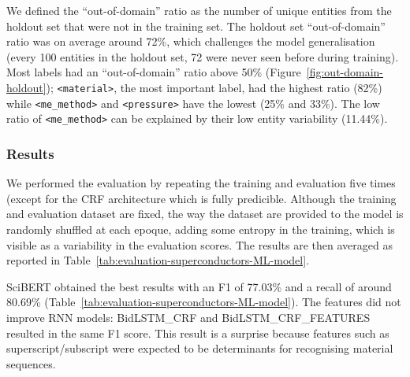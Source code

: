 We defined the ``out-of-domain'' ratio as the number of unique entities from the holdout set that were not in the training set.
The holdout set ``out-of-domain'' ratio was on average around 72\%, which challenges the model generalisation (every 100 entities in the holdout set, 72 were never seen before during training).
Most labels had an ``out-of-domain'' ratio above 50\%  (Figure~\ref{fig:out-domain-holdout});  \texttt{<material>}, the most important label, had the highest ratio (82\%) while \texttt{<me\_method>} and \texttt{<pressure>} have the lowest (25\% and 33\%). 
The low ratio of \texttt{<me\_method>} can be explained by their low entity variability (11.44\%).

\subsubsection{Results}
We performed the evaluation by repeating the training and evaluation five times (except for the CRF architecture which is fully predicible. Although the training and evaluation dataset are fixed, the way the dataset are provided to the model is randomly shuffled at each epoque, adding some entropy in the training, which is visible as a variability in the evaluation scores.
The results are then averaged as reported in Table~\ref{tab:evaluation-superconductors-ML-model}.

SciBERT obtained the best results with an F1 of 77.03\% and a recall of around 80.69\% (Table~\ref{tab:evaluation-superconductors-ML-model}).
The features did not improve RNN models: BidLSTM\_CRF and BidLSTM\_CRF\_FEATURES resulted in the same F1 score.
This result is a surprise because features such as superscript/subscript were expected to be determinants for recognising material sequences.


